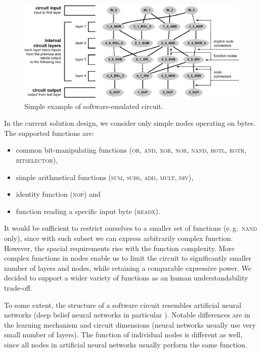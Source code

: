 \documentclass[12pt,twoside]{fithesis2}		%
\renewcommand{\_}{\leavevmode \kern0.0em\vbox{\hrule width0.4em}}
\newcommand{\squarebullet}{\textcolor{black}{\raisebox{0.15em}{\rule{4pt}{4pt}}}}
\newenvironment{myItemize}{
  \begin{itemize}[leftmargin=2em,rightmargin=1em,itemsep=\parskip ,parsep=0em,topsep=0em,partopsep=0em]
  \renewcommand{\labelitemi}{\squarebullet}
  \renewcommand{\labelitemii}{$\diamond$}
}{
  \end{itemize}
}
\begin{document}
\begin{figure}[t!]
\centering
\includegraphics[width=\textwidth]{images/circuit-final}
\caption{Simple example of software-emulated circuit.}
\label{fig:circuit-example}
\end{figure}

In the current solution design, we consider only simple nodes operating on bytes. The supported functions are:
\begin{myItemize}
\item common bit-manipulating functions (\textsc{or, and, xor, nor, nand, rotl, rotr, bitselector}),
\item simple arithmetical functions (\textsc{sum, subs, add, mult, div}),
\item identity function (\textsc{nop}) and
\item function reading a specific input byte (\textsc{readx}).
\end{myItemize}

\noindent
It would be sufficient to restrict ourselves to a smaller set of functions (e.\,g.\ \textsc{nand} only),
since with such subset we can express arbitrarily complex function. However, the spacial requirements rise with the function
complexity. More complex functions in nodes enable us to limit the circuit to significantly smaller number of 
layers and nodes, while retaining a comparable expressive power.
We decided to support a wider variety of functions as an human understandability trade-off.

To some extent, the structure of a software circuit resembles artificial neural networks 
(deep belief neural networks in particular \parencite{neural-networks}). Notable differences are in
the learning mechanism and circuit dimensions (neural networks usually use very small number of layers). 
The function of individual nodes is different as well, since all nodes in artificial neural networks usually perform the same function.
\end{document}
